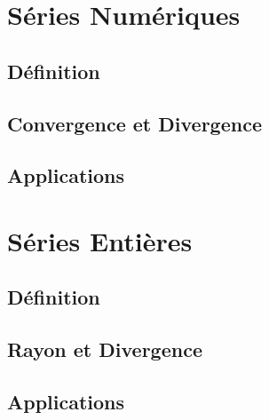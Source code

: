 \chapter{Séries Numériques}\label{nseries}
\section{Définition}\label{nseries:def}
\section{Convergence et Divergence}\label{nseries:comp}
\section{Applications}\label{nseries:app}

\chapter{Séries Entières}\label{pseries}
\section{Définition}\label{pseries:def}
\section{Rayon et Divergence}\label{pseries:comp}
\section{Applications}\label{pseries:app}
